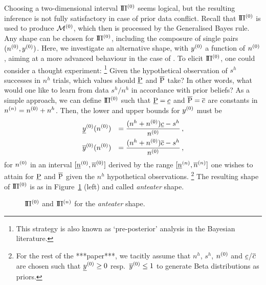 Choosing a two-dimensional interval $\text{I}\!\Pi^{(0)}$ seems logical,
but the resulting inference is not fully satisfactory in case of prior data conflict.
Recall that $\text{I}\!\Pi^{(0)}$ is used to produce $\mathcal{M}^{(0)}$, %
which then is processed by the Generalised Bayes rule. Any shape can be chosen for $\text{I}\!\Pi^{(0)}$,
including the composure of single pairs $(n^{(0)}, y^{(0)})$. %
Here, we investigate
an alternative shape, with $y^{(0)}$ a function of $n^{(0)}$, aiming at a more advanced behaviour in the case of \pdc.
To elicit $\text{I}\!\Pi^{(0)}$, one could consider a thought experiment:%
\footnote{This strategy is also known as `pre-posterior' analysis in the Bayesian literature.}
Given the hypothetical observation of $s^h$ successes in $n^h$ trials,
which values should $\underline{\operatorname{P}}$ and $\overline{\operatorname{P}}$ take? In other words, what
would one like to learn from data $s^h/n^h$ in accordance with
prior beliefs? As a simple approach, we can define $\text{I}\!\Pi^{(0)}$ such
that $\underline{\operatorname{P}} = \underline{c}$ and $\overline{\operatorname{P}} = \overline{c}$ are constants in $n^{(n)} = n^{(0)} + n^h$.
Then, the lower and upper bounds for $y^{(0)}$ must be %
\begin{equation} \label{equ:anteater-y0}
\begin{aligned}
&
\underline{y}^{(0)}(n^{(0)}) &= \frac{(n^h + n^{(0)})\underline{c} - s^h}{n^{(0)}}\,, \\
&
\overline{y}^{(0)}(n^{(0)}) &= \frac{(n^h + n^{(0)})\overline{c} - s^h}{n^{(0)}}\,,
\end{aligned}
\end{equation}
for $n^{(0)}$ in an interval $[\underline{n}^{(0)}, \overline{n}^{(0)}]$ derived by the range $[\underline{n}^{(n)}, \overline{n}^{(n)}]$ one wishes to attain for $\underline{\operatorname{P}}$ and $\overline{\operatorname{P}}$
given the $n^h$ hypothetical observations.%
\footnote{For the rest of the ***paper***, we tacitly assume that $n^h$, $s^h$, $n^{(0)}$ and $\underline{c}$/$\overline{c}$
are chosen such that $\underline{y}^{(0)} \geq 0$ resp.\ $\overline{y}^{(0)} \leq 1$ to generate Beta distributions as priors.}
The resulting shape of $\text{I}\!\Pi^{(0)}$ is as in Figure~\ref{fig:anteater-ex1} (left) and called \emph{anteater} shape.
%
\begin{figure}%
\caption{ $\text{I}\!\Pi^{(0)}$ and $\text{I}\!\Pi^{(n)}$ for the \emph{anteater} shape.}
\label{fig:anteater-ex1}
\end{figure}

